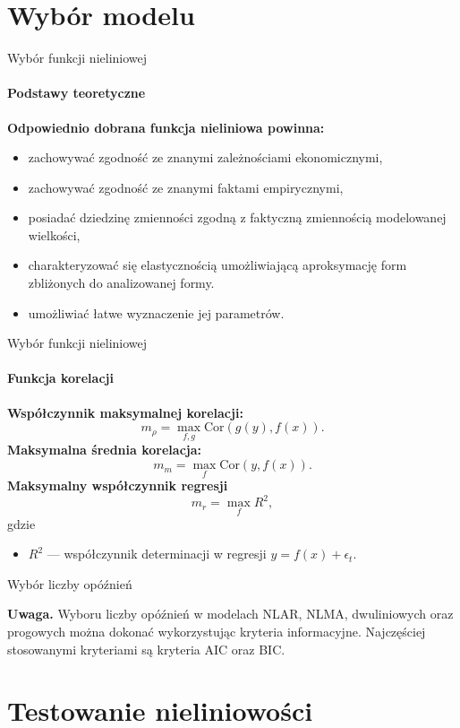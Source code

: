 \documentclass[a4paper, 11pt]{beamer}
\begin{document}
	\section{Wybór modelu}
	
	\begin{frame}{Wybór funkcji nieliniowej}
		\framesubtitle{Podstawy teoretyczne}
		\textbf{Odpowiednio dobrana funkcja nieliniowa powinna:}
		\begin{itemize}
			\item zachowywać zgodność ze znanymi zależnościami ekonomicznymi,
			\item zachowywać zgodność ze znanymi faktami empirycznymi,
			\item posiadać dziedzinę zmienności zgodną z faktyczną zmiennością modelowanej wielkości,
			\item charakteryzować się elastycznością umożliwiającą aproksymację form zbliżonych do analizowanej formy.
			\item umożliwiać łatwe wyznaczenie jej parametrów.
		\end{itemize}
	\end{frame}
	
	\begin{frame}{Wybór funkcji nieliniowej}
		\framesubtitle{Funkcja korelacji}
		\textbf{Współczynnik maksymalnej korelacji:} \[
			m_{\rho} = \max_{f,g} \mbox{Cor}\left(g\left(y\right), f\left(x\right)\right).
		\]
		\textbf{Maksymalna średnia korelacja:} \[
			m_{m} = \max_{f} \mbox{Cor}\left(y, f\left(x\right)\right).
		\]
		\textbf{Maksymalny współczynnik regresji} \[
			m_{r} = \max_{f} R^2,
		\] gdzie
		\begin{itemize}
			\item $R^2$ --- współczynnik determinacji w regresji $y=f\left(x\right)+\epsilon_t.$
		\end{itemize}
	\end{frame}
	
	\begin{frame}{Wybór liczby opóźnień}
		\begin{alert}{\textbf{Uwaga.}}
			Wyboru liczby opóźnień w modelach NLAR, NLMA, dwuliniowych oraz progowych można dokonać
			wykorzystując kryteria informacyjne. Najczęściej stosowanymi kryteriami są kryteria AIC oraz BIC.
		\end{alert}
	\end{frame}
	
	\section{Testowanie nieliniowości}
	
\end{document}
